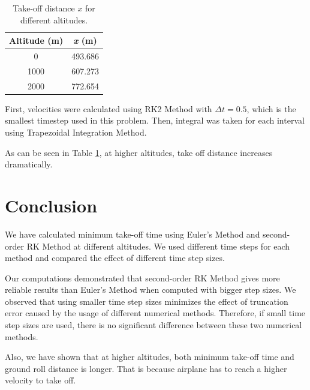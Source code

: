 \documentclass[letterpaper,12pt]{article}
\begin{document}
\begin{table}[!h]
        \begin{center}
        \caption{Take-off distance $x$ for different altitudes.}
        \vspace{1em}
        \label{tbl:takeoff}
        \begin{tabular}{|c|c|} 
        \hline
        \multicolumn{1}{|c|}{\bf{Altitude (m)}} & \multicolumn{1}{c|}{\bf{\textit{x} (m)}} \\
        \hline
        0 &   493.686 \\ \hline
        1000 &   607.273 \\ \hline
        2000 &   772.654 \\ \hline
        \end{tabular}
        \end{center}
        \end{table}

First, velocities were calculated using RK2 Method with $\Delta t = 0.5$, which is the smallest
timestep used in this problem. Then, integral was taken for each interval using Trapezoidal Integration Method.

As can be seen in Table \ref{tbl:takeoff}, at higher altitudes, take off distance increases dramatically.

\section{Conclusion}
We have calculated minimum take-off time using Euler's Method and second-order RK Method at different altitudes.
We used different time steps for each method and compared the effect of different time step sizes. 

Our computations demonstrated that second-order RK Method gives more reliable results than Euler's Method
when computed with bigger step sizes. We observed that using smaller time step sizes minimizes the effect of truncation error
caused by the usage of different numerical methods. Therefore, if small time step sizes are used, there is no 
significant difference between these two numerical methods.

Also, we have shown that at higher altitudes, both minimum take-off time and ground roll distance is longer.
That is because airplane has to reach a higher velocity to take off.
\end{document}
